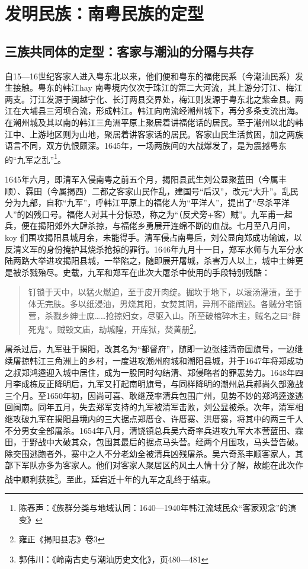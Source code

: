\chapter{发明民族：南粤民族的定型}

\section{三族共同体的定型：客家与潮汕的分隔与共存}

自15—16世纪客家人进入粤东北以来，他们便和粤东的福佬民系（今潮汕民系）发生接触。粤东的韩江hay 南粤境内仅次于珠江的第二大河流，其上游分汀江、梅江两支。汀江发源于闽越宁化、长汀两县交界处，梅江则发源于粤东北之紫金县。两江在大埔县三河坝合流，形成韩江。韩江向南流经潮州城下，再分多条支流出海。在潮州城及其以南的韩江三角洲平原上聚居着讲福佬话的居民。至于潮州以北的韩江中、上游地区则为山地，聚居着讲客家话的居民。客家山民生活贫困，加之两族语言不同，双方仇恨颇深。1645年，一场两族间的大战爆发了，是为震撼粤东的“九军之乱”\footnote{ 陈春声：《族群分类与地域认同：1640—1940年韩江流域民众“客家观念”的演变》}。

1645年六月，即清军入侵南粤之前五个月，揭阳县武生刘公显聚蓝田（今属丰顺）、霖田（今属揭西）二都之客家山民作乱，建国号“后汉”，改元“大升”。乱民分为九部，自称“九军”，呼韩江平原上的福佬人为“平洋人”，提出了“尽杀平洋人”的凶残口号。福佬人对其十分惊恐，称之为“（反犬旁+客）贼”。九军甫一起兵，便在揭阳郊外大肆杀掠，与福佬乡勇展开连绵不断的血战。七月至八月间，koy 们围攻揭阳县城月余，未能得手。清军侵占南粤后，刘公显向郑成功输诚，以反清义军的身份掩护其烧杀抢掠的罪行。1646年九月十一日，郑军水师与九军分水陆两路大举进攻揭阳县城，一举陷之，随即展开屠城，杀害万人以上，城中士绅更是被杀戮殆尽。史载，九军和郑军在此次大屠杀中使用的手段特别残酷：

\begin{quote}

钉锁于天中，以猛火燃迫，至于皮开肉绽。掘坎于地下，以滚汤灌渍，至于体无完肤。多以纸浸油，男烧其阳，女焚其阴，异刑不能阐述。各贼分宅镇营，杀戮乡绅士庶……抢掠妇女，尽驱入山。所至破棺碎木主，贼名之曰“辟死鬼”。贼毁文庙，劫城隍，开库狱，焚黄册\footnote{雍正《揭阳县志》卷3}。

\end{quote}

屠杀过后，九军驻于揭阳，改其名为“都督府”，随即一边张挂清帝国旗号，一边继续屠掠韩江三角洲上的乡村，一度进攻潮州府城和潮阳县城，并于1647年将郑成功之叔郑鸿逵迎入城中居住，成为一股同时勾结清、郑侵略者的罪恶势力。1648年四月李成栋反正降明后，九军又打起南明旗号，与同样降明的潮州总兵郝尚久部激战三个月。至1650年初，因尚可喜、耿继茂率清兵包围广州，见势不妙的郑鸿逵遂逃回闽南。同年五月，失去郑军支持的九军被清军击败，刘公显被杀。次年，清军相继攻破九军在揭阳县境内的三大据点郑厝仓、许厝寨、洪厝寨，将其中的两三千人不分男女全部屠杀。1654年八月，清饶镇总兵吴六奇率兵进攻九军大本营蓝田、霖田，于野战中大破其众，包围其最后的据点马头营。经两个月围攻，马头营告破。除突围逃跑者外，寨中之人不分老幼全被清兵凶残屠杀。吴六奇系丰顺客家人，其部下军队亦多为客家人。他们对客家人聚居区的风土人情十分了解，故能在此次作战中顺利获胜\footnote{郭伟川：《岭南古史与潮汕历史文化》，页480—481}。至此，延宕近十年的九军之乱终于结束。

